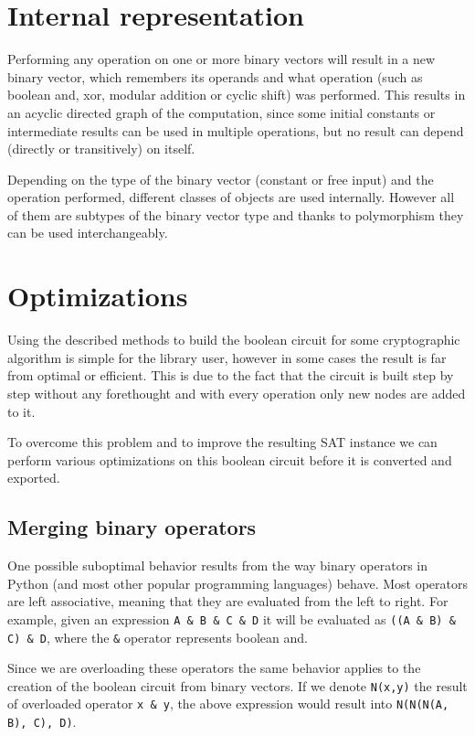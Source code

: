 \section{Internal representation}

Performing any operation on one or more binary vectors will result in a new binary vector, which remembers its operands and what operation (such as boolean and, xor, modular addition or cyclic shift) was performed.
This results in an acyclic directed graph of the computation, since some initial constants or intermediate results can be used in multiple operations, but no result can depend (directly or transitively) on itself.

Depending on the type of the binary vector (constant or free input) and the operation performed, different classes of objects are used internally.
However all of them are subtypes of the binary vector type and thanks to polymorphism they can be used interchangeably. 

\section{Optimizations}

Using the described methods to build the boolean circuit for some cryptographic algorithm is simple for the library user, however in some cases the result is far from optimal or efficient.
This is due to the fact that the circuit is built step by step without any forethought and with every operation only new nodes are added to it.

To overcome this problem and to improve the resulting SAT instance we can perform various optimizations on this boolean circuit before it is converted and exported.

\subsection{Merging binary operators}

One possible suboptimal behavior results from the way binary operators in Python (and most other popular programming languages) behave.
Most operators are left associative, meaning that they are evaluated from the left to right.
For example, given an expression \texttt{A \& B \& C \& D} it will be evaluated as \texttt{((A \& B) \& C) \& D}, where the \texttt{\&} operator represents boolean and.

Since we are overloading these operators the same behavior applies to the creation of the boolean circuit from binary vectors.
If we denote \texttt{N(x,y)} the result of overloaded operator \texttt{x \& y}, the above expression would result into \texttt{N(N(N(A, B), C), D)}.

